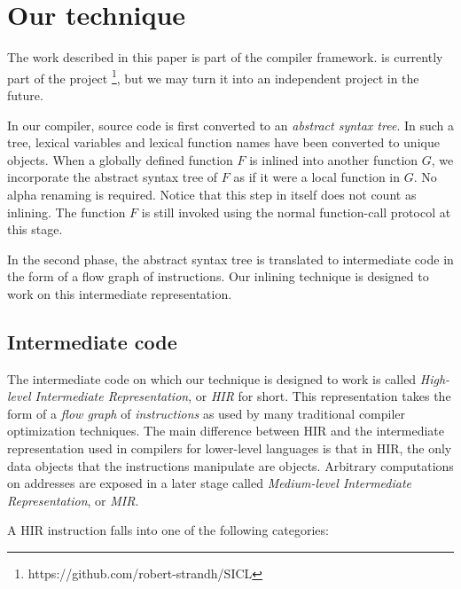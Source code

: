 \section{Our technique}

The work described in this paper is part of the \cleavir{} compiler
framework.  \cleavir{} is currently part of the \sicl{} project%
\footnote{https://github.com/robert-strandh/SICL}, but we may turn it
into an independent project in the future.

In our compiler, source code is first converted to an \emph{abstract
  syntax tree}.  In such a tree, lexical variables and lexical
function names have been converted to unique objects.  When a globally
defined function $F$ is inlined into another function $G$, we
incorporate the abstract syntax tree of $F$ as if it were a local
function in $G$.  No alpha renaming is required.  Notice that this
step in itself does not count as inlining.  The function $F$ is still
invoked using the normal function-call protocol at this stage.

In the second phase, the abstract syntax tree is translated to
intermediate code in the form of a flow graph of instructions.  Our
inlining technique is designed to work on this intermediate
representation.

\subsection{Intermediate code}

The intermediate code on which our technique is designed to work is
called \emph{High-level Intermediate Representation}, or \emph{HIR}
for short.  This representation takes the form of a \emph{flow graph}
of \emph{instructions} as used by many traditional compiler
optimization techniques.  The main difference between HIR and the
intermediate representation used in compilers for lower-level
languages is that in HIR, the only data objects that the instructions
manipulate are \commonlisp{} objects.  Arbitrary computations on
addresses are exposed in a later stage called \emph{Medium-level
  Intermediate Representation}, or \emph{MIR}.

A HIR instruction falls into one of the following categories:

